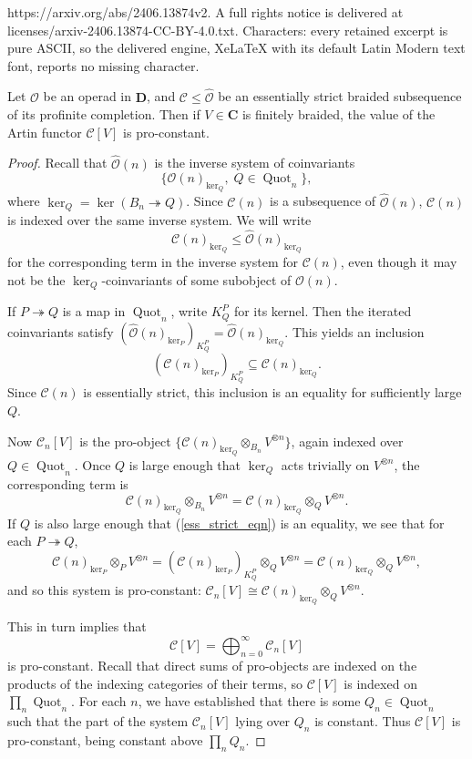 \documentclass[10pt,a4paper]{amsart}
\newcommand{\CC} {\mathcal{C}}
\newcommand{\OO}{\mathcal{O}}
\newcommand{\OOhat}{\widehat{\OO}}
\DeclareMathOperator{\Quot}{Quot}
\newcommand{\bC} {\mathbf{C}}
\newcommand{\bD} {\mathbf{D}}
\newcommand{\beqn}{\begin{equation}}
\newcommand{\eeqn}{\end{equation}}
\begin{document}
https://arxiv.org/abs/2406.13874v2. A full rights notice is delivered at licenses/arxiv-2406.13874-CC-BY-4.0.txt. Characters: every retained excerpt is pure ASCII, so the delivered engine, XeLaTeX with its default Latin Modern text font, reports no missing character.
\begin{lem} \label{tech_const_lem}

Let $\OO$ be an operad in $\bD$, and $\CC \leq \OOhat$ be an essentially strict braided subsequence of its profinite completion.  Then if $V \in \bC$ is finitely braided, the value of the Artin functor $\CC[V]$ is pro-constant.

\end{lem}

\begin{proof}

Recall that $\OOhat(n)$ is the inverse system of coinvariants
%
$$\{\OO(n)_{\ker_Q}, \; Q \in \Quot_n\},$$
%
where $\ker_Q =\ker(B_n \twoheadrightarrow Q)$.  Since $\CC(n)$ is a subsequence of $\OOhat(n)$, $\CC(n)$ is indexed over the same inverse system.  We will write 
%
$$\CC(n)_{\ker_Q} \leq \OOhat(n)_{\ker_Q}$$
%
for the corresponding term in the inverse system for $\CC(n)$, even though it may not be the $\ker_Q$-coinvariants of some subobject of $\OO(n)$.

If $P \twoheadrightarrow Q$ is a map in $\Quot_n$, write $K^P_Q$ for its kernel.  Then the iterated coinvariants satisfy $(\OOhat(n)_{\ker_P})_{K^P_Q} = \OOhat(n)_{\ker_Q}$.  This yields an inclusion
%
\beqn \label{ess_strict_eqn} (\CC(n)_{\ker_P})_{K^P_Q} \subseteq \CC(n)_{\ker_Q}.\eeqn
%
Since $\CC(n)$ is essentially strict, this inclusion is an equality for sufficiently large $Q$.

Now $\CC_n[V]$ is the pro-object $\{\CC(n)_{\ker_Q} \otimes_{B_n} V^{\otimes n} \}$, again indexed over $Q \in \Quot_n$.  Once $Q$ is large enough that $\ker_Q$ acts trivially on $V^{\otimes n}$, the corresponding term is
%
$$\CC(n)_{\ker_Q} \otimes_{B_n} V^{\otimes n} = \CC(n)_{\ker_Q} \otimes_{Q} V^{\otimes n}.$$
%
If $Q$ is also large enough that (\ref{ess_strict_eqn}) is an equality, we see that for each $P \twoheadrightarrow Q$,
%
$$\CC(n)_{\ker_P} \otimes_{P} V^{\otimes n} = (\CC(n)_{\ker_P})_{K^P_Q} \otimes_Q V^{\otimes n} =  \CC(n)_{\ker_Q} \otimes_{Q} V^{\otimes n},$$
%
and so this system is pro-constant: $\CC_n[V] \cong \CC(n)_{\ker_Q} \otimes_Q V^{\otimes n}$.  

This in turn implies that 
%
$$\CC[V] = \bigoplus_{n=0}^{\infty} \CC_n[V]$$
%
is pro-constant.  Recall that direct sums of pro-objects are indexed on the products of the indexing categories of their terms, so $\CC[V]$ is indexed on $\prod_n \Quot_n$.  For each $n$, we have established that there is some $Q_n \in \Quot_n$ such that the part of the system $\CC_n[V]$ lying over $Q_n$ is constant.  Thus $\CC[V]$ is pro-constant, being constant above $\prod_n Q_n$.


\end{proof}
\end{document}
